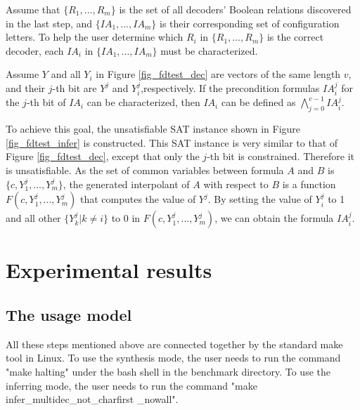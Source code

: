 \documentclass[runningheads,a4paper]{llncs}
\begin{document}
Assume that $\{R_1,\dots,R_{m}\}$ is the set of all decoders' Boolean relations discovered in the last step,
and $\{IA_1,\dots,IA_{m}\}$ is their corresponding set of configuration letters.
To help the user determine which $R_i$ in $\{R_1,\dots,R_{m}\}$ is the correct decoder,
each $IA_i$ in $\{IA_1,\dots,IA_{m}\}$ must be characterized.

Assume $Y$ and all $Y_i$ in Figure \ref{fig_fdtest_dec} are vectors of the same length $v$,
and their $j$-th bit are $Y^{j}$ and $Y_i^{j}$,respectively.
If the precondition formulas $IA^j_i$ for the $j$-th bit of $IA_i$ can be characterized,
then $IA_i$ can be defined as $\bigwedge _{j=0}^{v-1} IA^j_i$.

To achieve this goal,
the unsatisfiable SAT instance shown in Figure \ref{fig_fdtest_infer} is constructed.
This SAT instance is very similar to that of Figure \ref{fig_fdtest_dec},
except that only the $j$-th bit is constrained.
Therefore it is unsatisfiable.
As the set of common variables between formula $A$ and $B$ is $\{c, Y_1^j, \dots, Y_m^j\}$,
the generated interpolant of $A$ with respect to $B$ is a function $F(c,Y_1^j, \dots, Y_m^j)$ that computes the value of $Y^j$.
By setting the value of $Y_i^j$ to 1 and all other $\{Y_k^j|k\ne i\}$ to 0 in $F(c,Y_1^j, \dots, Y_m^j)$,
we can obtain the formula $IA^j_i$.



\section{Experimental results}\label{sec_exp}
\subsection{The usage model}
All these steps mentioned above are connected together by the standard make tool in Linux.
To use the synthesis mode,
the user needs to run the command "make halting" under the bash shell in the benchmark directory.
To use the inferring mode,
the user needs to run the command "make infer\_multidec\_not\_charfirst \_nowall".
\end{document}

